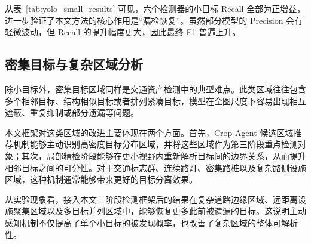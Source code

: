\begin{table}[htbp]
    \centering
    \caption{不同检测器在小目标上的性能对比}
    \label{tab:yolo_small_results}
\end{table}

从表~\ref{tab:yolo_small_results} 可见，六个检测器的小目标 Recall 全部为正增益，进一步验证了本文方法的核心作用是“漏检恢复”。虽然部分模型的 Precision 会有轻微波动，但 Recall 的提升幅度更大，因此最终 F1 普遍上升。

\subsection{密集目标与复杂区域分析}
\label{subsec:dense_region_analysis}

除小目标外，密集目标区域同样是交通资产检测中的典型难点。此类区域往往包含多个相邻目标、结构相似目标或者排列紧凑目标，模型在全图尺度下容易出现相互遮蔽、重复抑制或部分遗漏等问题。

本文框架对这类区域的改进主要体现在两个方面。首先，Crop Agent 候选区域推荐机制能够主动识别高密度目标分布区域，并将这些区域作为第三阶段重点检测对象；其次，局部精检阶段能够在更小视野内重新解析目标间的边界关系，从而提升相邻目标之间的可分性。对于交通标志群、连续路灯、密集路桩以及复杂路侧设施区域，这种机制通常能够带来更好的目标分离效果。

从实验现象看，接入本文三阶段检测框架后的结果在复杂道路边缘区域、远距离设施聚集区域以及多目标并列区域中，能够恢复更多此前被遗漏的目标。这说明主动感知机制不仅提高了单个小目标的被发现概率，也改善了复杂区域的整体可解析性。

